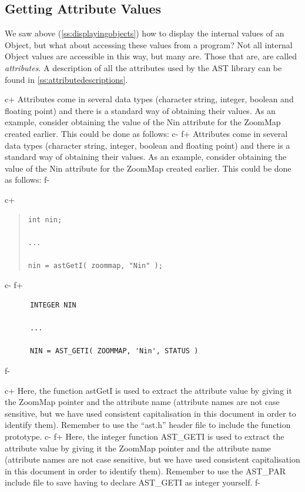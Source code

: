 \documentclass[twoside,11pt]{article}
\newcommand{\appref}[1]{Appendix~\ref{#1}}
\newcommand{\secref}[1]{\S\ref{#1}}
\renewcommand{\appref}[1]{\ref{#1}}
\renewcommand{\secref}[1]{\ref{#1}}
\begin{document}
\subsection{\label{ss:gettingattributes}Getting Attribute Values}

We saw above (\secref{ss:displayingobjects}) how to display the
internal values of an Object, but what about accessing these values
from a program?  Not all internal Object values are accessible in this
way, but many are. Those that are, are called {\em{attributes}}. A
description of all the attributes used by the AST library can be found
in \appref{ss:attributedescriptions}.

c+
Attributes come in several data types (character string, integer,
boolean and floating point) and there is a standard way of obtaining
their values. As an example, consider obtaining the value of the Nin
attribute for the ZoomMap created earlier. This could be done as
follows:
c-
f+
Attributes come in several data types (character string, integer,
boolean and floating point) and there is a standard way of obtaining
their values. As an example, consider obtaining the value of the Nin
attribute for the ZoomMap created earlier. This could be done as
follows:
f-

c+
\begin{quote}
\small
\begin{verbatim}
int nin;

...

nin = astGetI( zoommap, "Nin" );
\end{verbatim}
\normalsize
\end{quote}
c-
f+
\small
\begin{verbatim}
      INTEGER NIN

      ...

      NIN = AST_GETI( ZOOMMAP, 'Nin', STATUS )
\end{verbatim}
\normalsize
f-

c+
Here, the function astGetI is used to extract the attribute value by
giving it the ZoomMap pointer and the attribute name (attribute names
are not case sensitive, but we have used consistent capitalisation in
this document in order to identify them). Remember to use the
``ast.h'' header file to include the function prototype.
c-
f+
Here, the integer function AST\_GETI is used to extract the attribute
value by giving it the ZoomMap pointer and the attribute name
(attribute names are not case sensitive, but we have used consistent
capitalisation in this document in order to identify them). Remember
to use the AST\_PAR include file to save having to declare AST\_GETI
as integer yourself.
f-
\end{document}
